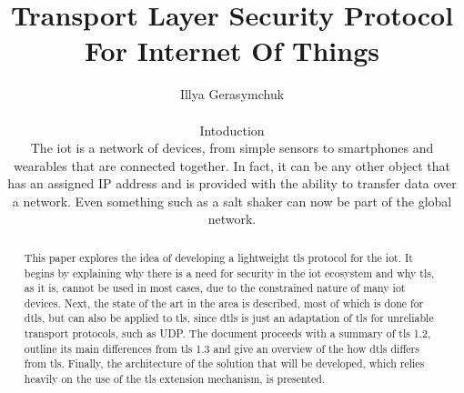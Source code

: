 \documentclass{llncs}
\begin{document}
%
\frontmatter          %
%
\pagestyle{headings}  %
%

\tableofcontents
\newpage

\mainmatter              %
%
\title{Transport Layer Security Protocol For Internet Of Things}
%
%
\author{{Illya Gerasymchuk} \\
%
%
%
\maketitle              %

\begin{abstract}
This paper explores the idea of developing a lightweight \gls{tls} protocol
for the \gls{iot}. It begins by explaining why there is a need for security in
the \gls{iot} ecosystem and why \gls{tls}, as it is, cannot be used in most cases,
due to the constrained nature of many \gls{iot} devices. Next, the state
of the art in the area is described, most of which is done for \gls{dtls}, but can
also be applied to \gls{tls}, since \gls{dtls} is just an adaptation of
\gls{tls} for unreliable transport protocols, such as UDP. The document proceeds with a
summary of \gls{tls} 1.2, outline its main differences from \gls{tls} 1.3
and give an overview of the how \gls{dtls} differs from \gls{tls}. Finally, the architecture of the solution that will be developed, which relies
heavily on the use of the \gls{tls} extension mechanism, is presented.

\end{abstract}
%
\section{Intoduction}
%

The \gls{iot} is a network of devices, from simple sensors to smartphones and wearables
that are connected together. In fact, it can be any other object that has an assigned
IP address and is provided with the ability to transfer data over a network. Even
something such as a salt shaker\cite{SMALTThe76:online} can now be part of the global network.

}
\end{document}
